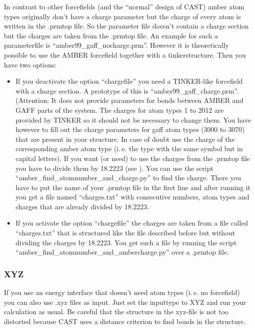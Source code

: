 \documentclass[10pt,a4paper]{article} %
\begin{document}
In contrast to other forcefields (and the ``normal'' design of CAST) amber atom types originally don't have a charge parameter but the charge of every atom is written in the .prmtop file. So the parameter file doesn't contain a charge section but the charges are taken from the .prmtop file. An example for such a parameterfile is ``amber99\_gaff\_nocharge.prm''. However it is theoretically possible to use the AMBER forcefield together with a tinkerstructure. Then you have two options:
\begin{itemize}
\item If you deactivate the option ``chargefile'' you need a TINKER-like forcefield with a charge section. A prototype of this is ``amber99\_gaff\_charge.prm''. (Attention: It does not provide parameters for bonds between AMBER and GAFF parts of the system. The charges for atom types 1 to 2012 are provided by TINKER so it should not be necessary to change them. You have however to fill out the charge parameters for gaff atom types (3000 to 3070) that are present in your structure. In case of doubt use the charge of the corresponding amber atom type (i.\,e. the type with the same symbol but in capital letters). If you want (or need) to use the charges from the .prmtop file you have to divide them by 18.2223 (see \cite{noauthor_amber_nodate}). You can use the script ``amber\_find\_atomnumber\_and\_charge.py'' to find the charge. There you have to put the name of your .prmtop file in the first line and after running it you get a file named ``charges.txt'' with consecutive numbers, atom types and charges that are already divided by 18.2223.
\item If you activate the option ``chargefile'' the charges are taken from a file called ``charges.txt'' that is structured like the file described before but without dividing the charges by 18.2223. You get such a file by running the script ``amber\_find\_atomnumber\_and\_ambercharge.py'' over a .prmtop file.
\end{itemize}

\subsubsection{XYZ}

If you use an energy interface that doesn't need atom types (i.\,e. no forcefield) you can also use .xyz files as input. Just set the inputtype to XYZ and run your calculation as usual. Be careful that the structure in the xyz-file is not too distorted because CAST uses a distance criterion to find bonds in the structure.
\end{document}
